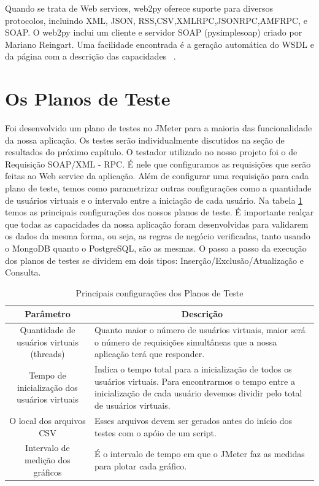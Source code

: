 Quando se trata de Web services, web2py oferece suporte para diversos protocolos, incluindo XML, JSON, RSS,CSV,XMLRPC,JSONRPC,AMFRPC, e SOAP.  O web2py inclui um cliente e servidor SOAP (pysimplesoap) criado por Mariano Reingart. Uma facilidade encontrada é a geração automática do WSDL e da página com a descrição das capacidades ~\cite{siteweb2py}.

\section{Os Planos de Teste}

Foi desenvolvido um plano de testes no JMeter para a maioria das funcionalidade da nossa aplicação. Os testes serão individualmente discutidos na seção de resultados do próximo capítulo. O testador utilizado no nosso projeto foi o de Requisição SOAP/XML - RPC. É nele que configuramos as requisições que serão feitas ao Web service da aplicação. Além de configurar uma requisição para cada plano de teste, temos como parametrizar outras configurações como a quantidade de usuários virtuais e o intervalo entre a iniciação de cada usuário. Na tabela \ref{tab:configplanoteste} temos as principais configurações dos nossos planos de teste. É importante realçar que todas as capacidades da nossa aplicação foram desenvolvidas para validarem os dados da mesma forma, ou seja, as regras de negócio verificadas, tanto usando o MongoDB quanto o PostgreSQL, são as mesmas. O passo a passo da execução dos planos de testes se dividem em dois tipos: Inserção/Exclusão/Atualização e Consulta.

\begin{table}
	\caption{Principais configurações dos Planos de Teste}
	\begin{center}
	\begin{tabularx}{\textwidth}{ | c | X | }
	\hline
		\textbf{Parâmetro} & \multicolumn{1}{c|}{\textbf{Descrição}} \\
	\hline
		Quantidade de usuários virtuais (threads) & Quanto maior o número de usuários virtuais, maior será o número de requisições simultâneas que a nossa aplicação terá que responder.\\
	\hline 
		Tempo de inicialização dos usuários virtuais & Indica o tempo total para a inicialização de todos os usuários virtuais. Para encontrarmos o tempo entre a inicialização de cada usuário devemos dividir pelo total de usuários virtuais.\\
	\hline
		O local dos arquivos CSV & Esses arquivos devem ser gerados antes do início dos testes com o apóio de um script.\\
	\hline
		Intervalo de medição dos gráficos & É o intervalo de tempo em que o JMeter faz as medidas para plotar cada gráfico.\\
	\hline
	\end {tabularx}
	\end{center}
	\label{tab:configplanoteste}
\end{table}

